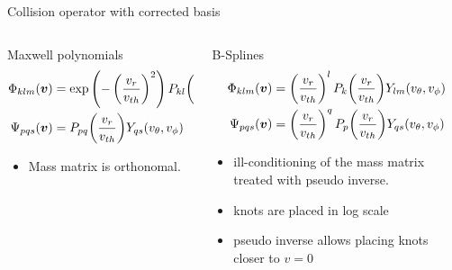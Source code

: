 \documentclass[mathserif, aspectratio=169]{beamer}
\newcommand{\vect}[1]{\boldsymbol{#1}}
\newcommand{\of}[1]{\mleft( #1 \mright)}
\begin{document}
\begin{frame}{Collision operator with corrected basis}
	\begin{columns}
		\begin{column}{0.5\textwidth}
			Maxwell polynomials
			\small
			\begin{align*}
				\Phi_{klm} (\vect{v}) &= \exp\left(-\left(\frac{v_r}{v_{th}}\right) ^ 2\right)  P_{kl}\of{\frac{v_r}{v_{th}}} Y_{lm}(v_\theta,v_\phi) \\
				\Psi_{pqs} (\vect{v}) &= P_{pq}\of{\frac{v_r}{v_{th}}} Y_{qs}(v_\theta,v_\phi)
			\end{align*}
			\begin{itemize}
				\item Mass matrix is orthonomal.  
			\end{itemize}
		\end{column}
		\begin{column}{0.5\textwidth}
			B-Splines 
			\small
			\begin{align*}
			\Phi_{klm} (\vect{v}) &= \left(\frac{v_r}{v_{th}}\right)^l P_k\of{\frac{v_r}{v_{th}}} Y_{lm}(v_\theta,v_\phi) \\
			\Psi_{pqs} (\vect{v}) &= \left(\frac{v_r}{v_{th}}\right)^q P_p\of{\frac{v_r}{v_{th}}} Y_{qs}(v_\theta,v_\phi)
			\end{align*}
			\begin{itemize}
				\item ill-conditioning of the mass matrix treated with pseudo inverse. 
				\item knots are placed in log scale
				\item pseudo inverse allows placing knots closer to $v=0$
			\end{itemize}
		\end{column}
	\end{columns}
\end{frame}

\end{document}
